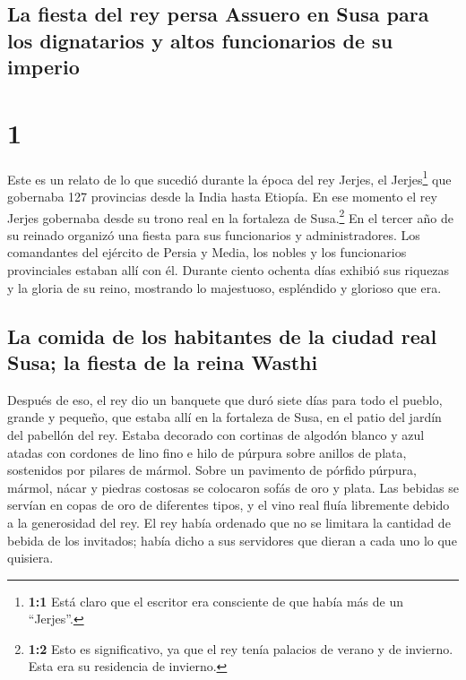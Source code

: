 \hypertarget{la-fiesta-del-rey-persa-assuero-en-susa-para-los-dignatarios-y-altos-funcionarios-de-su-imperio}{%
\subsection{La fiesta del rey persa Assuero en Susa para los dignatarios
y altos funcionarios de su
imperio}\label{la-fiesta-del-rey-persa-assuero-en-susa-para-los-dignatarios-y-altos-funcionarios-de-su-imperio}}

\hypertarget{section}{%
\section{1}\label{section}}

 Este es un relato de lo que sucedió durante la época del
rey Jerjes, el Jerjes\footnote{\textbf{1:1} Está claro que el escritor
  era consciente de que había más de un ``Jerjes''.} que gobernaba 127
provincias desde la India hasta Etiopía.  En ese momento
el rey Jerjes gobernaba desde su trono real en la fortaleza de
Susa.\footnote{\textbf{1:2} Esto es significativo, ya que el rey tenía
  palacios de verano y de invierno. Esta era su residencia de invierno.}
 En el tercer año de su reinado organizó una fiesta para
sus funcionarios y administradores. Los comandantes del ejército de
Persia y Media, los nobles y los funcionarios provinciales estaban allí
con él.  Durante ciento ochenta días exhibió sus riquezas
y la gloria de su reino, mostrando lo majestuoso, espléndido y glorioso
que era.

\hypertarget{la-comida-de-los-habitantes-de-la-ciudad-real-susa-la-fiesta-de-la-reina-wasthi}{%
\subsection{La comida de los habitantes de la ciudad real Susa; la
fiesta de la reina
Wasthi}\label{la-comida-de-los-habitantes-de-la-ciudad-real-susa-la-fiesta-de-la-reina-wasthi}}

 Después de eso, el rey dio un banquete que duró siete
días para todo el pueblo, grande y pequeño, que estaba allí en la
fortaleza de Susa, en el patio del jardín del pabellón del rey.
 Estaba decorado con cortinas de algodón blanco y azul
atadas con cordones de lino fino e hilo de púrpura sobre anillos de
plata, sostenidos por pilares de mármol. Sobre un pavimento de pórfido
púrpura, mármol, nácar y piedras costosas se colocaron sofás de oro y
plata.  Las bebidas se servían en copas de oro de
diferentes tipos, y el vino real fluía libremente debido a la
generosidad del rey.  El rey había ordenado que no se
limitara la cantidad de bebida de los invitados; había dicho a sus
servidores que dieran a cada uno lo que quisiera.

